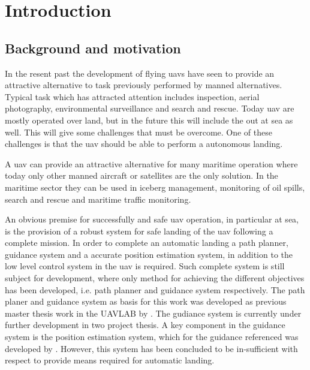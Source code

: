 
\chapter{Introduction}

\section{Background and motivation}
In the resent past the development of flying \glspl{uav} have seen to provide an attractive alternative to task previously performed by manned alternatives. Typical task which has attracted attention includes inspection, aerial photography, environmental surveillance and search and rescue. Today \gls{uav} are mostly operated over land, but in the future this will include the out at sea as well. This will give some challenges that must be overcome. One of these challenges is that the \gls{uav} should be able to perform a autonomous landing.

A \gls{uav} can provide an attractive alternative for many maritime operation where today only other manned aircraft or satellites are the only solution. In the maritime sector they can be used in iceberg management, monitoring of oil spills, search and rescue and maritime traffic monitoring.

An obvious premise for successfully and safe \gls{uav} operation, in particular at sea, is the provision of a robust system for safe landing of the \gls{uav} following a complete mission. In order to complete an automatic landing a path planner, guidance system and a accurate position estimation system, in addition to the low level control system in the \gls{uav} is required. Such complete system is still subject for development, where only method for achieving the different objectives has been developed, i.e. path planner and guidance system respectively. The path planer and guidance system as basis for this work was developed as previous master thesis work in the UAVLAB by \citep{Froelich}. The gudiance system is currently under further development in two project thesis. A key component in the guidance system is the position estimation system, which for the guidance referenced was developed by \citep{Spockeli}. However, this system has been concluded to be in-sufficient with respect to provide means required for automatic landing.

